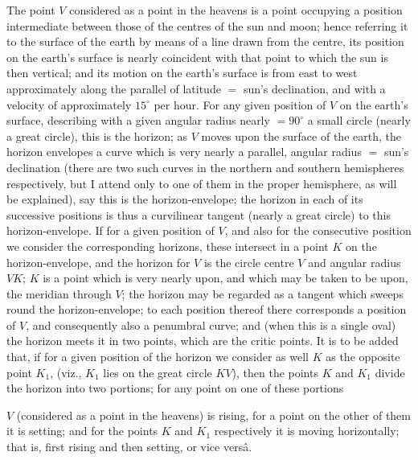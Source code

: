 \documentclass[11pt,a4paper]{article}
\begin{document}
The point $V$ considered as a point in the heavens is a point occupying a position intermediate between those of the centres of the sun and moon; hence referring it to the surface of the earth by means of a line drawn from the centre, its position on the earth's surface is nearly coincident with that point to which the sun is then vertical; and its motion on the earth's surface is from east to west approximately along the parallel of latitude $=$ sun's declination, and with a velocity of approximately $15^{\circ}$ per hour. For any given position of $V$ on the earth's surface, describing with a given angular radius nearly $= 90^{\circ}$ a small circle (nearly a great circle), this is the horizon; as $V$ moves upon the surface of the earth, the horizon envelopes a curve which is very nearly a parallel, angular radius $=$ sun's declination (there are two such curves in the northern and southern hemispheres respectively, but I attend only to one of them in the proper hemisphere, as will be explained), say this is the horizon-envelope; the horizon in each of its successive positions is thus a curvilinear tangent (nearly a great circle) to this horizon-envelope. If for a given position of $V$, and also for the consecutive position we consider the corresponding horizons, these intersect in a point $K$ on the horizon-envelope, and the horizon for $V$ is the circle centre $V$ and angular radius $VK$; $K$ is a point which is very nearly upon, and which may be taken to be upon, the meridian through $V$; the horizon may be regarded as a tangent which sweeps round the horizon-envelope; to each position thereof there corresponds a position of $V$, and consequently also a penumbral curve; and (when this is a single oval) the horizon meets it in two points, which are the critic points. It is to be added that, if for a given position of the horizon we consider as well $K$ as the opposite point $K_{1}$, (viz., $K_{1}$ lies on the great circle $KV$), then the points $K$ and $K_{1}$ divide the horizon into two portions; for any point on one of these portions

\newpage


\noindent $V$ (considered as a point in the heavens) is rising, for a point on the other of them it is setting; and for the points $K$ and $K_{1}$ respectively it is moving horizontally; that is, first rising and then setting, or vice vers\^a.

\medskip
\end{document}
